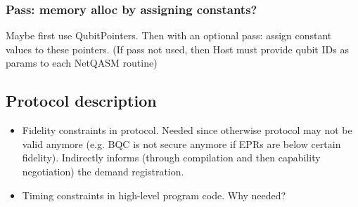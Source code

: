 \subsubsection{Pass: memory alloc by assigning constants?}
Maybe first use QubitPointers. Then with an optional pass: assign constant values to these pointers. (If pass not used, then Host must provide qubit IDs as params to each NetQASM routine)



\subsection{Protocol description}
\begin{itemize}
    \item Fidelity constraints in protocol. Needed since otherwise protocol may not be valid anymore (e.g. BQC is not secure anymore if EPRs are below certain fidelity). Indirectly informs (through compilation and then capability negotiation) the demand registration.
    \item Timing constraints in high-level program code. Why needed?
\end{itemize}

